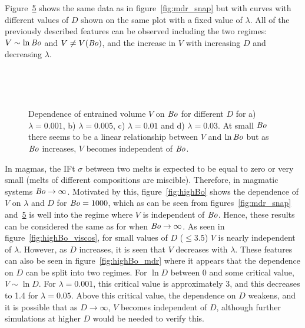 \documentclass[12pt]{article}
\newcommand\Bo{\mbox{\textit{Bo}}}  %
\begin{document}
Figure~\ref{fig:viscos_snap} shows the same data as in figure~\ref{fig:mdr_snap} but with curves with different values of $D$ shown on the same plot with a fixed value of $\lambda$. All of the previously described features can be observed including the two regimes: $V \sim \ln\Bo$ and $V \neq V(\Bo)$, and the increase in $V$ with increasing $D$ and decreasing $\lambda$.

    \begin{figure}
      \centering
      \begin{subfigure}[b]{0.45\textwidth}
        \resizebox{\textwidth}{!}{\Large }
        \caption{}
        \label{fig:viscos_rat=0.001}
      \end{subfigure}
      ~
      \begin{subfigure}[b]{0.45\textwidth}
        \resizebox{\textwidth}{!}{\Large }
        \caption{}
        \label{fig:viscos_rat=0.005}
      \end{subfigure}
      
      \begin{subfigure}[b]{0.45\textwidth}
        \resizebox{\textwidth}{!}{\Large }
        \caption{}
        \label{fig:viscos_rat=0.01}
      \end{subfigure}
      ~
      \begin{subfigure}[b]{0.45\textwidth}
        \resizebox{\textwidth}{!}{\Large }
        \caption{}
        \label{fig:mdr=viscos_rat=0.03}
      \end{subfigure}
      \caption{Dependence of entrained volume $V$ on $\Bo$ for different $D$ for a) $\lambda = 0.001$, b) $\lambda = 0.005$, c) $\lambda = 0.01$ and d) $\lambda = 0.03$. At small $\Bo$ there seems to be a linear relationship between $V$ and $\ln\Bo$ but as $\Bo$ increases, $V$ becomes independent of $\Bo$. }\label{fig:viscos_snap}
    \end{figure}

In magmas, the IFt $\sigma$ between two melts is expected to be equal to zero or very small (melts of different compositions are miscible). Therefore, in magmatic systems $\Bo \to \infty$. Motivated by this, figure~\ref{fig:highBo} shows the dependence of $V$ on $\lambda$ and $D$ for $\Bo = 1000$, which as can be seen from figures~\ref{fig:mdr_snap} and~\ref{fig:viscos_snap} is well into the regime where $V$ is independent of $\Bo$. Hence, these results can be considered the same as for when $\Bo \to \infty$. As seen in figure~\ref{fig:highBo_viscos}, for small values of $D$ ($\leq 3.5$) $V$ is nearly independent of $\lambda$. However, as $D$ increases, it is seen that $V$ decreases with $\lambda$. These features can also be seen in figure~\ref{fig:highBo_mdr} where it appears that the dependence on $D$ can be split into two regimes. For $\ln D$ between 0 and some critical value, $V \sim \ln D$. For $\lambda = 0.001$, this critical value is approximately 3, and this decreases to 1.4 for $\lambda = 0.05$. Above this critical value, the dependence on $D$ weakens, and it is possible that as $D \to \infty$, $V$ becomes independent of $D$, although further simulations at higher $D$ would be needed to verify this.
\end{document}
